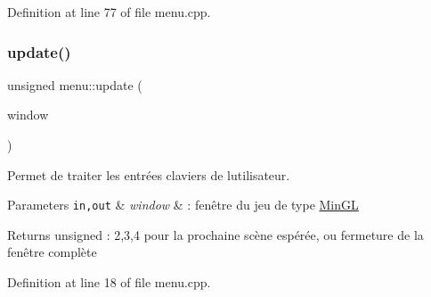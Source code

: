 Definition at line 77 of file menu.\+cpp.

\mbox{\label{namespacemenu_afbcc14456a55b6670fff8690f2d2e3c6}} 
\subsubsection{\texorpdfstring{update()}{update()}}
{\footnotesize\ttfamily unsigned menu\+::update (\begin{DoxyParamCaption}\item[{\hyperlink{class_min_g_l}{Min\+GL} \&}]{window }\end{DoxyParamCaption})}



Permet de traiter les entrées claviers de l\textquotesingle{}utilisateur. 


\begin{DoxyParams}[1]{Parameters}
\mbox{\tt in,out}  & {\em window} & \+: fenêtre du jeu de type \hyperlink{class_min_g_l}{Min\+GL} \\
\hline
\end{DoxyParams}
\begin{DoxyReturn}{Returns}
unsigned \+: 2,3,4 pour la prochaine scène espérée, ou fermeture de la fenêtre complète 
\end{DoxyReturn}


Definition at line 18 of file menu.\+cpp.

